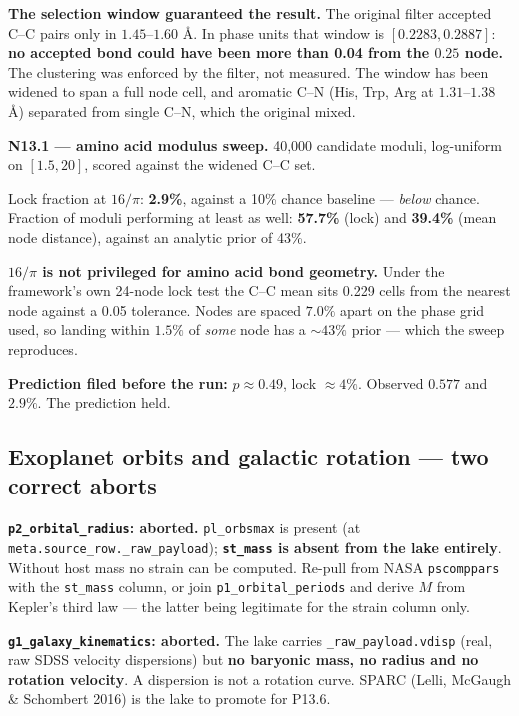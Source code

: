 \documentclass[11pt, letterpaper, openany]{book}
\begin{document}
\begin{correctionbox}
\textbf{The selection window guaranteed the result.} The original filter accepted C--C pairs only in
$1.45$--$1.60$ \AA. In phase units that window is $[0.2283, 0.2887]$: \textbf{no accepted bond could
have been more than 0.04 from the $0.25$ node.} The clustering was enforced by the filter, not
measured. The window has been widened to span a full node cell, and aromatic C--N (His, Trp, Arg at
$1.31$--$1.38$ \AA) separated from single C--N, which the original mixed.
\end{correctionbox}

\begin{nullbox}
\textbf{N13.1 --- amino acid modulus sweep.} 40{,}000 candidate moduli, log-uniform on $[1.5, 20]$,
scored against the widened C--C set.

\medskip
Lock fraction at $16/\pi$: \textbf{2.9\%}, against a 10\% chance baseline --- \emph{below} chance.
Fraction of moduli performing at least as well: \textbf{57.7\%} (lock) and \textbf{39.4\%} (mean node
distance), against an analytic prior of 43\%.

\medskip
\textbf{$16/\pi$ is not privileged for amino acid bond geometry.} Under the framework's own 24-node
lock test the C--C mean sits 0.229 cells from the nearest node against a 0.05 tolerance. Nodes are
spaced $7.0\%$ apart on the phase grid used, so landing within $1.5\%$ of \emph{some} node has a
$\sim 43\%$ prior --- which the sweep reproduces.

\medskip
\textbf{Prediction filed before the run:} $p \approx 0.49$, lock $\approx 4\%$. Observed $0.577$ and
$2.9\%$. The prediction held.
\end{nullbox}

\subsection*{Exoplanet orbits and galactic rotation --- two correct aborts}

\begin{warningbox}
\textbf{\texttt{p2\_orbital\_radius}: aborted.} \texttt{pl\_orbsmax} is present (at
\texttt{meta.source\_row.\_raw\_payload}); \textbf{\texttt{st\_mass} is absent from the lake
entirely}. Without host mass no strain can be computed. Re-pull from NASA \texttt{pscomppars} with
the \texttt{st\_mass} column, or join \texttt{p1\_orbital\_periods} and derive $M$ from Kepler's
third law --- the latter being legitimate for the strain column only.

\medskip
\textbf{\texttt{g1\_galaxy\_kinematics}: aborted.} The lake carries
\texttt{\_raw\_payload.vdisp} (real, raw SDSS velocity dispersions) but \textbf{no baryonic mass, no
radius and no rotation velocity}. A dispersion is not a rotation curve. SPARC (Lelli, McGaugh \&
Schombert 2016) is the lake to promote for P13.6.
\end{warningbox}
\end{document}
